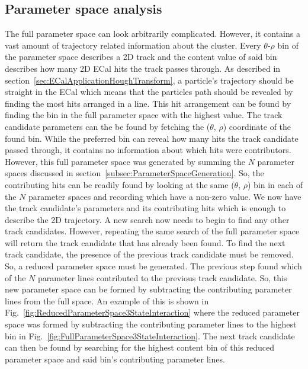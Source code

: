 \subsection{Parameter space analysis}
\label{subsec:ParameterSpaceAnalysis}
The full parameter space can look arbitrarily complicated. However, it contains a vast amount of trajectory related information about the cluster.  Every $\theta$-$\rho$ bin of the parameter space describes a 2D track and the content value of said bin describes how many 2D ECal hits the track passes through.  As described in section~\ref{sec:ECalApplicationHoughTransform}, a particle's trajectory should be straight in the ECal which means that the particles path should be revealed by finding the most hits arranged in a line.  This hit arrangement can be found by finding the bin in the full parameter space with the highest value.  The track candidate parameters can the be found by fetching the ($\theta$, $\rho$) coordinate of the found bin.
\newline
\newline
While the preferred bin can reveal how many hits the track candidate passed through, it contains no information about which hits were contributors.  However, this full parameter space was generated by summing the $N$ parameter spaces discussed in section~\ref{subsec:ParameterSpaceGeneration}.  So, the contributing hits can be readily found by looking at the same ($\theta$, $\rho$) bin in each of the $N$ parameter spaces and recording which have a non-zero value.  We now have the track candidate's parameters and its contributing hits which is enough to describe the 2D trajectory.
\newline
\newline
A new search now needs to begin to find any other track candidates.  However, repeating the same search of the full parameter space will return the track candidate that has already been found.  To find the next track candidate, the presence of the previous track candidate must be removed.  So, a reduced parameter space must be generated. The previous step found which of the $N$ parameter lines contributed to the previous track candidate.  So, this new parameter space can be formed by subtracting the contributing parameter lines from the full space.  An example of this is shown in Fig.~\ref{fig:ReducedParameterSpace3StateInteraction} where the reduced parameter space was formed by subtracting the contributing parameter lines to the highest bin in Fig.~\ref{fig:FullParameterSpace3StateInteraction}.  The next track candidate can then be found by searching for the highest content bin of this reduced parameter space and said bin's contributing parameter lines. 
